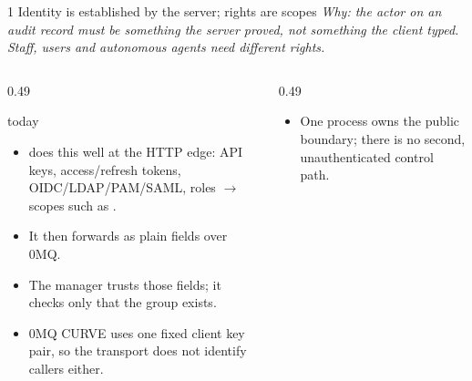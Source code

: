 

\begin{frame}{1 \quad Identity is established by the server; rights are scopes}
    {\footnotesize\itshape Why: the actor on an audit record must be something the server proved, not something
    the client typed. Staff, users and autonomous agents need different rights.}
    \vspace{0.05cm}
    \begin{columns}[T]
        \begin{column}{0.49\textwidth}
            \begin{alertblock}{\legacy{} today}
                \footnotesize
                \begin{itemize}
                    \item {} does this well at the HTTP edge: API keys, access/refresh
                          tokens, OIDC/LDAP/PAM/SAML, roles $\rightarrow$ scopes such as
                          . 
                    \item It then forwards  as plain fields
                          over 0MQ. 
                    \item The manager trusts those fields; it checks only that the group exists.
                    \item 0MQ CURVE uses one fixed client key pair, so the transport does not identify callers either.
                \end{itemize}
            \end{alertblock}
        \end{column}
        \begin{column}{0.49\textwidth}
            \begin{block}{\vtwo{}}
                \footnotesize
                \begin{itemize}
                    \item One process owns the public boundary; there is no second, unauthenticated control path.

\end{itemize}
\end{block}
\end{column}
\end{columns}
\end{frame}
